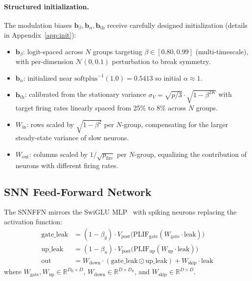 \documentclass[10pt,twocolumn]{article}
\newcommand{\vpost}{V_{\text{post}}}
\newcommand{\R}{\mathbb{R}}
\begin{document}
\paragraph{Structured initialization.}
The modulation biases $\mathbf{b}_\beta, \mathbf{b}_\alpha, \mathbf{b}_{\text{th}}$ receive carefully designed initialization (details in Appendix~\ref{app:init}):
\begin{itemize}
    \item $\mathbf{b}_\beta$: logit-spaced across $N$ groups targeting $\beta \in [0.80, 0.99]$ (multi-timescale), with per-dimension $\mathcal{N}(0, 0.1)$ perturbation to break symmetry.
    \item $\mathbf{b}_\alpha$: initialized near $\text{softplus}^{-1}(1.0) = 0.5413$ so initial $\alpha \approx 1$.
    \item $\mathbf{b}_{\text{th}}$: calibrated from the stationary variance $\sigma_V = \sqrt{p/3} \cdot \sqrt{1 - \beta^{2K}}$ with target firing rates linearly spaced from 25\% to 8\% across $N$ groups.
    \item $W_{\text{in}}$: rows scaled by $\sqrt{1 - \beta^2}$ per $N$-group, compensating for the larger steady-state variance of slow neurons.
    \item $W_{\text{out}}$: columns scaled by $1/\sqrt{p_{\text{fire}}}$ per $N$-group, equalizing the contribution of neurons with different firing rates.
\end{itemize}


\subsection{SNN Feed-Forward Network}
\label{sec:snn-ffn}

The SNNFFN mirrors the SwiGLU MLP~\citep{touvron2023llama} with spiking neurons replacing the activation function:
\begin{align}
    \text{gate\_leak} &= (1-\beta_g) \cdot \vpost\big(\text{PLIF}_{\text{gate}}(W_{\text{gate}} \cdot \text{leak})\big) \label{eq:ffn-gate} \\
    \text{up\_leak} &= (1-\beta_u) \cdot \vpost\big(\text{PLIF}_{\text{up}}(W_{\text{up}} \cdot \text{leak})\big) \label{eq:ffn-up} \\
    \text{out} &= W_{\text{down}} \cdot (\text{gate\_leak} \odot \text{up\_leak}) + W_{\text{skip}} \cdot \text{leak} \label{eq:ffn-out}
\end{align}
where $W_{\text{gate}}, W_{\text{up}} \in \R^{D_{\text{ff}} \times D}$, $W_{\text{down}} \in \R^{D \times D_{\text{ff}}}$, and $W_{\text{skip}} \in \R^{D \times D}$.
\end{document}
